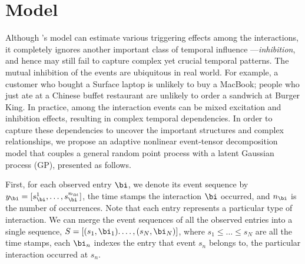

\section{Model}
Although \citet{zhe2018stochastic}'s model can estimate various triggering effects among the interactions, it completely ignores another important class of temporal influence ---\textit{inhibition}, and hence may still fail to capture complex yet crucial temporal patterns. The mutual inhibition of the events  are ubiquitous in real world. For example, a customer who bought a Surface laptop is unlikely to buy a MacBook; people who just ate at a Chinese buffet restaurant are unlikely to order a sandwich at Burger King. In practice, among the interaction events can be mixed excitation and inhibition effects, resulting in complex temporal dependencies. In order to capture these dependencies to uncover the important structures and complex relationships, we propose an adaptive nonlinear event-tensor decomposition model that couples a general random point process with a latent Gaussian process (GP), presented as follows.


First, for each observed entry $\bi$, we denote its event sequence by $y_{\bi} = [s_\bi^1, \ldots, s_\bi^{n_\bi}]$, \ie the time stamps the interaction $\bi$ occurred, and $n_\bi$ is the number of occurrences. Note that each entry represents a particular type of interaction. We can merge the event sequences of all the observed entries into a single sequence, $S = [(s_1, \bi_1). \ldots, (s_N, \bi_N)]$, where $s_1 \le \ldots \le s_N$ are all the time stamps, each $\bi_n$  indexes the entry that event $s_n$ belongs to, \ie the particular interaction occurred at $s_n$. 

